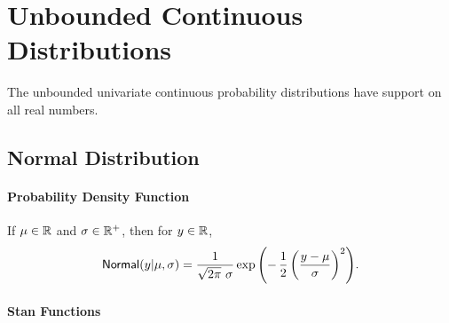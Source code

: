 \chapter{Unbounded Continuous Distributions}

\noindent
The unbounded univariate continuous probability distributions have
support on all real numbers.


\section{Normal Distribution}\label{normal-distribution.section}

\subsubsection{Probability Density Function}

If $\mu \in \reals$ and $\sigma \in \posreals$, then for $y \in
\reals$,
\[
\distro{Normal}(y|\mu,\sigma)
=
\frac{1}{\sqrt{2 \pi} \ \sigma}
\exp\left( - \, \frac{1}{2}
           \left(  \frac{y - \mu}{\sigma} \right)^2
    \right)
\!.
\]


\subsubsection{Stan Functions}

